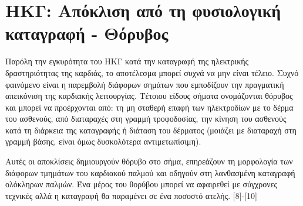 \documentclass{report}
\begin{document}
	\section{ΗΚΓ: Απόκλιση από τη φυσιολογική καταγραφή - Θόρυβος}
	Παρόλη την εγκυρότητα του ΗΚΓ κατά την καταγραφή της ηλεκτρικής δραστηριότητας της καρδιάς, το αποτέλεσμα μπορεί συχνά να μην είναι τέλειο. Συχνό φαινόμενο είναι η παρεμβολή διάφορων σημάτων που εμποδίζουν την πραγματική απεικόνιση της καρδιακής λειτουργίας. Τέτοιου είδους σήματα ονομάζονται θόρυβος και μπορεί να προέρχονται από: τη μη σταθερή επαφή των ηλεκτροδίων με το δέρμα του ασθενούς, από διαταραχές στη γραμμή τροφοδοσίας, την κίνηση του ασθενούς κατά τη διάρκεια της καταγραφής ή διάταση του δέρματος (μοιάζει με διαταραχή στη γραμμή βάσης, είναι όμως δυσκολότερα αντιμετωπίσιμη). 
	\par
	Αυτές οι αποκλίσεις δημιουργούν θόρυβο στο σήμα, επηρεάζουν τη μορφολογία των διάφορων τμημάτων του καρδιακού παλμού και οδηγούν στη λανθασμένη καταγραφή ολόκληρων παλμών. Ένα μέρος του θορύβου μπορεί να αφαιρεθεί με σύγχρονες τεχνικές αλλά η καταγραφή θα παραμένει σε ένα ποσοστό ατελής. [8]-[10] 
\end{document}
